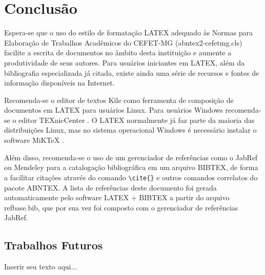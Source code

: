 %
%

\chapter{Conclusão}
\label{chap:conclusao}

Espera-se que o uso do estilo de formatação LATEX adequado às Normas para Elaboração de Trabalhos Acadêmicos do CEFET-MG ({\ttfamily abntex2-cefetmg.cls}) facilite a escrita de documentos no âmbito desta instituição e aumente a produtividade de seus autores. Para usuários iniciantes em LATEX, além da bibliografia especializada já citada, existe ainda uma série de recursos \cite{CTAN2009} e fontes de informação \cite{TeX-Br2009,Wikibooks2009} disponíveis na Internet.

Recomenda-se o editor de textos Kile como ferramenta de composição de documentos em LATEX para usuários Linux. Para usuários Windows recomenda-se o editor TEXnicCenter \cite{TeXnicCenter2009}. O LATEX normalmente já faz parte da maioria das distribuições Linux, mas no sistema operacional Windows é necessário instalar o software MiKTeX \cite{MiKTeX2009}.

Além disso, recomenda-se o uso de um gerenciador de referências como o JabRef \cite{JabRef2009} ou Mendeley \cite{Mendeley2009} para a catalogação bibliográfica em um arquivo BIBTEX, de forma a facilitar citações através do comando \verb#\cite{}# e outros comandos correlatos do pacote ABNTEX. A lista de referências deste documento foi gerada automaticamente pelo software LATEX + BIBTEX a partir do arquivo {\ttfamily refbase.bib}, que por sua vez foi composto com o gerenciador de referências JabRef.

\section{Trabalhos Futuros}
\label{sec:trabalhosFuturos}

Inserir seu texto aqui...
